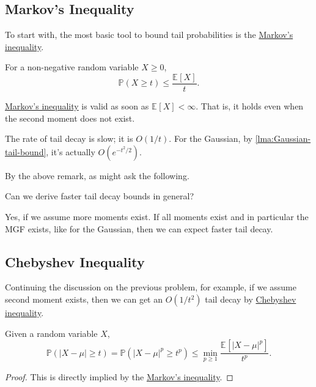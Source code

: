 \subsection{Markov's Inequality}
To start with, the most basic tool to bound tail probabilities is the \hyperref[lma:Markov-inequality]{Markov's inequality}.

\begin{lemma}\label{lma:Markov-inequality}
	For a non-negative random variable \(X \geq 0\),
	\[
		\mathbb{P} (X \geq t) \leq \frac{\mathbb{E}_{}\left[X \right] }{t}.
	\]
\end{lemma}

\begin{note}
	\hyperref[lma:Markov-inequality]{Markov's inequality} is valid as soon as \(\mathbb{E}_{}\left[X \right] < \infty \). That is, it holds even when the second moment does not exist.
\end{note}

\begin{remark}
	The rate of tail decay is slow; it is \(O(1 / t)\). For the Gaussian, by \autoref{lma:Gaussian-tail-bound}, it's actually \(O(e^{-t^2 / 2})\).
\end{remark}

By the above remark, as might ask the following.

\begin{problem*}
	Can we derive faster tail decay bounds in general?
\end{problem*}
\begin{answer}
	Yes, if we assume more moments exist. If all moments exist and in particular the MGF exists, like for the Gaussian, then we can expect faster tail decay.
\end{answer}

\subsection{Chebyshev Inequality}
Continuing the discussion on the previous problem, for example, if we assume second moment exists, then we can get an \(O(1 / t^2)\) tail decay by \hyperref[lma:Chebyshev-inequality]{Chebyshev inequality}.

\begin{lemma}\label{lma:Chebyshev-inequality}
	Given a random variable \(X\),
	\[
		\mathbb{P} (\vert X - \mu  \vert \geq t ) = \mathbb{P} (\vert X - \mu  \vert^p \geq t ^p) \leq \min _{p \geq 1} \frac{\mathbb{E}_{}\left[\vert X-\mu  \vert^p \right] }{t^p}.
	\]
\end{lemma}
\begin{proof}
	This is directly implied by the \hyperref[lma:Markov-inequality]{Markov's inequality}.
\end{proof}

